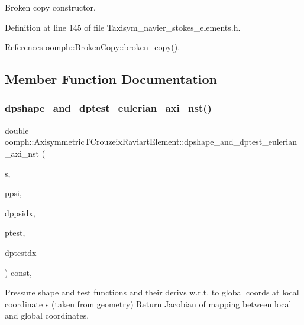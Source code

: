 Broken copy constructor. 



Definition at line 145 of file Taxisym\+\_\+navier\+\_\+stokes\+\_\+elements.\+h.



References oomph\+::\+Broken\+Copy\+::broken\+\_\+copy().



\subsection{Member Function Documentation}
\mbox{\label{classoomph_1_1AxisymmetricTCrouzeixRaviartElement_af257076318be5297b3e740ea42552fc5}} 
\subsubsection{\texorpdfstring{dpshape\+\_\+and\+\_\+dptest\+\_\+eulerian\+\_\+axi\+\_\+nst()}{dpshape\_and\_dptest\_eulerian\_axi\_nst()}}
{\footnotesize\ttfamily double oomph\+::\+Axisymmetric\+T\+Crouzeix\+Raviart\+Element\+::dpshape\+\_\+and\+\_\+dptest\+\_\+eulerian\+\_\+axi\+\_\+nst (\begin{DoxyParamCaption}\item[{const \hyperlink{classoomph_1_1Vector}{Vector}$<$ double $>$ \&}]{s,  }\item[{\hyperlink{classoomph_1_1Shape}{Shape} \&}]{ppsi,  }\item[{\hyperlink{classoomph_1_1DShape}{D\+Shape} \&}]{dppsidx,  }\item[{\hyperlink{classoomph_1_1Shape}{Shape} \&}]{ptest,  }\item[{\hyperlink{classoomph_1_1DShape}{D\+Shape} \&}]{dptestdx }\end{DoxyParamCaption}) const\hspace{0.3cm}{\ttfamily [inline]}, {\ttfamily [protected]}}



Pressure shape and test functions and their derivs w.\+r.\+t. to global coords at local coordinate s (taken from geometry) Return Jacobian of mapping between local and global coordinates. 

